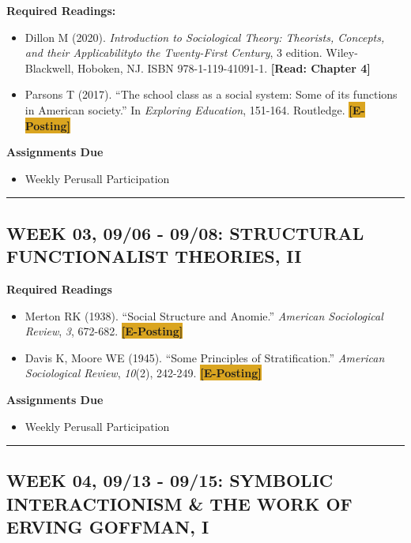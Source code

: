 \documentclass[11pt,]{article}
\providecommand{\tightlist}{%
  \setlength{\itemsep}{0pt}\setlength{\parskip}{0pt}}
\begin{document}
\textbf{Required Readings:}

\begin{itemize}
\item
  Dillon M (2020). \emph{Introduction to Sociological Theory: Theorists,
  Concepts, and their Applicabilityto the Twenty-First Century}, 3
  edition. Wiley-Blackwell, Hoboken, NJ. ISBN 978-1-119-41091-1.
  \textcolor{BrickRed}{\bf{[Read: Chapter 4]}}
\item
  Parsons T (2017). ``The school class as a social system: Some of its
  functions in American society.'' In \emph{Exploring Education},
  151-164. Routledge. \colorbox{Goldenrod}{\bf{[E-Posting]}}
\end{itemize}

\textbf{Assignments Due}

\begin{itemize}
\tightlist
\item
  Weekly Perusall Participation
\end{itemize}

\bigbreak
\hrule

\hypertarget{week-03-0906---0908-structural-functionalist-theories-ii}{%
\subsection{WEEK 03, 09/06 - 09/08: STRUCTURAL FUNCTIONALIST THEORIES,
II}\label{week-03-0906---0908-structural-functionalist-theories-ii}}

\textbf{Required Readings}

\begin{itemize}
\item
  Merton RK (1938). ``Social Structure and Anomie.'' \emph{American
  Sociological Review}, \emph{3}, 672-682.
  \colorbox{Goldenrod}{\bf{[E-Posting]}}
\item
  Davis K, Moore WE (1945). ``Some Principles of Stratification.''
  \emph{American Sociological Review}, \emph{10}(2), 242-249.
  \colorbox{Goldenrod}{\bf{[E-Posting]}}
\end{itemize}

\textbf{Assignments Due}

\begin{itemize}
\tightlist
\item
  Weekly Perusall Participation
\end{itemize}

\bigbreak
\hrule

\hypertarget{week-04-0913---0915-symbolic-interactionism-the-work-of-erving-goffman-i}{%
\subsection{WEEK 04, 09/13 - 09/15: SYMBOLIC INTERACTIONISM \& THE WORK
OF ERVING GOFFMAN,
I}\label{week-04-0913---0915-symbolic-interactionism-the-work-of-erving-goffman-i}}
\end{document}
